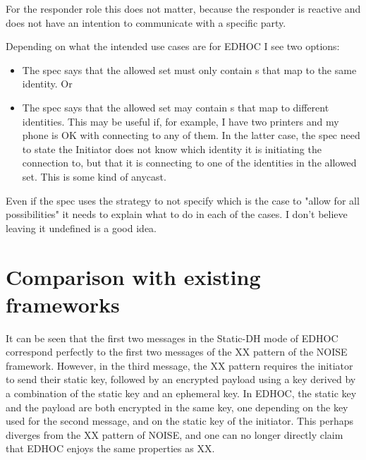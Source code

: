 \documentclass[a4paper,11pt]{article}
\theoremstyle{plain}
\theoremstyle{plain}
\begin{document}
For the responder role this does not matter, because the responder is reactive
and does not have an intention to communicate with a specific party.
%

Depending on what the intended use cases are for EDHOC I see two options:
\begin{itemize}
    \item The spec says that the allowed set must only contain s
            that map to the same identity. Or
    \item The spec says that the allowed set may contain s that map
            to different identities. This may be useful if, for example, I
            have two printers and my phone is OK with connecting to any of
            them. In the latter case, the spec need to state the Initiator
            does not know which identity it is initiating the connection to,
            but that it is connecting to one of the identities in the
            allowed set. This is some kind of anycast.
\end{itemize}
%
Even if the spec uses the strategy to not specify which is the case to
"allow for all possibilities" it needs to explain what to do in each of the
cases.
%
I don't believe leaving it undefined is a good idea.
%

\section{Comparison with existing frameworks}
It can be seen that the first two messages in the Static-DH mode of EDHOC correspond perfectly to the first two messages of the XX pattern of the NOISE framework. However, in the third message, the XX pattern requires the initiator to send their static key, followed by an encrypted payload using a key derived by a combination of the static key and an ephemeral key. In EDHOC, the static key and the payload are both encrypted in the same key, one depending on the key used for the second message, and on the static key of the initiator. This perhaps diverges from the XX pattern of NOISE, and one can no longer directly claim that EDHOC enjoys the same properties as XX. 


%
%

\end{document}

